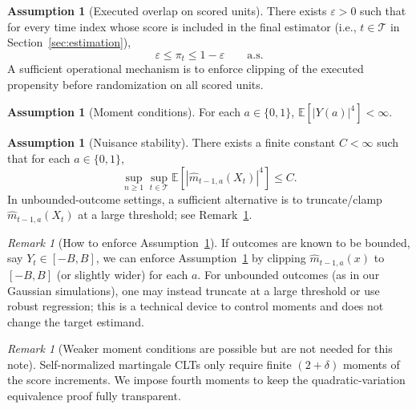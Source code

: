 \documentclass[11pt]{article}
\numberwithin{equation}{section}
\theoremstyle{plain}
\theoremstyle{definition}
\newtheorem{assumption}[theorem]{Assumption}
\theoremstyle{remark}
\newtheorem{remark}[theorem]{Remark}
\newcommand{\E}{\mathbb{E}}
\begin{document}
\begin{assumption}[Executed overlap on scored units]\label{ass:overlap}
There exists $\varepsilon>0$ such that for every time index whose score is included in the final estimator (i.e., $t\in\mathcal{T}$ in Section~\ref{sec:estimation}),
\begin{equation}\label{eq:overlap}
\varepsilon \le \pi_t \le 1-\varepsilon \qquad \text{a.s.}
\end{equation}
A sufficient operational mechanism is to enforce clipping of the executed propensity before randomization on all scored units.
\end{assumption}

\begin{assumption}[Moment conditions]\label{ass:moments}
For each $a\in\{0,1\}$, $\E[|Y(a)|^4]<\infty$.
\end{assumption}

\begin{assumption}[Nuisance stability]\label{ass:nuis_stab}
There exists a finite constant $C<\infty$ such that for each $a\in\{0,1\}$,
\[
\sup_{n\ge 1}\sup_{t\in\mathcal{T}} \E[|\widehat m_{t-1,a}(X_t)|^4]\le C.
\]
In unbounded-outcome settings, a sufficient alternative is to truncate/clamp $\widehat m_{t-1,a}(X_t)$ at a large threshold; see Remark~\ref{rem:enforce_nuis}.
\end{assumption}

\begin{remark}[How to enforce Assumption~\ref{ass:nuis_stab}]\label{rem:enforce_nuis}
If outcomes are known to be bounded, say $Y_t\in[-B,B]$, we can enforce Assumption~\ref{ass:nuis_stab} by clipping $\widehat m_{t-1,a}(x)$ to $[-B,B]$ (or slightly wider) for each $a$. For unbounded outcomes (as in our Gaussian simulations), one may instead truncate at a large threshold or use robust regression; this is a technical device to control moments and does not change the target estimand.
\end{remark}

\begin{remark}[Weaker moment conditions are possible but are not needed for this note]\label{rem:moment_conditions}
Self-normalized martingale CLTs only require finite $(2+\delta)$ moments of the
score increments. We impose fourth moments to keep the quadratic-variation
equivalence proof fully transparent.
\end{remark}
\end{document}
